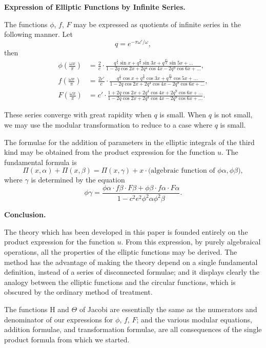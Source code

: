 \documentclass[11pt,a4paper]{book}
\begin{document}
\textbf{Expression of Elliptic Functions by Infinite Series.}

The functions $\phi$, $f$, $F$ may be expressed as quotients of infinite series in the
following manner. Let
\[
q = e^{-\pi \omega'/\omega},
\]
then
\begin{align*}
\phi\left(\frac{\omega x}{\pi}\right) &= \frac{2}{c} \cdot \frac{q^{\frac{1}{4}} \sin x + q^{\frac{9}{4}} \sin 3x + q^{\frac{25}{4}} \sin 5x + \ldots}{1 - 2q \cos 2x + 2q^4 \cos 4x - 2q^9 \cos 6x + \ldots},\\
f\left(\frac{\omega x}{\pi}\right) &= \frac{2c'}{c} \cdot \frac{q^{\frac{1}{4}} \cos x + q^{\frac{9}{4}} \cos 3x + q^{\frac{25}{4}} \cos 5x + \ldots}{1 - 2q \cos 2x + 2q^4 \cos 4x - 2q^9 \cos 6x + \ldots},\\
F\left(\frac{\omega x}{\pi}\right) &= c' \cdot \frac{1 + 2q \cos 2x + 2q^4 \cos 4x + 2q^9 \cos 6x + \ldots}{1 - 2q \cos 2x + 2q^4 \cos 4x - 2q^9 \cos 6x + \ldots}.
\end{align*}

\newpage
\setcounter{page}{153}

These series converge with great rapidity when $q$ is small. When $q$ is not small,
we may use the modular transformation to reduce to a case where $q$ is small.

The formulae for the addition of parameters in the elliptic integrals of the third
kind may be obtained from the product expression for the function $u$. The fundamental
formula is
\[
\Pi(x, \alpha) + \Pi(x, \beta) = \Pi(x, \gamma) + x \cdot \text{(algebraic function of } \phi\alpha, \phi\beta),
\]
where $\gamma$ is determined by the equation
\[
\phi\gamma = \frac{\phi\alpha \cdot f\beta \cdot F\beta + \phi\beta \cdot f\alpha \cdot F\alpha}{1 - c^2 e^2 \phi^2\alpha \phi^2\beta}.
\]

\newpage
\setcounter{page}{154}

\textbf{Conclusion.}

The theory which has been developed in this paper is founded entirely on the
product expression for the function $u$. From this expression, by purely algebraical
operations, all the properties of the elliptic functions may be derived. The method has
the advantage of making the theory depend on a single fundamental definition, instead
of a series of disconnected formulae; and it displays clearly the analogy between the
elliptic functions and the circular functions, which is obscured by the ordinary method
of treatment.

The functions $\mathrm{H}$ and $\Theta$ of Jacobi are essentially the same as the numerators and
denominator of our expressions for $\phi$, $f$, $F$; and the various modular equations,
addition formulae, and transformation formulae, are all consequences of the single
product formula from which we started.
\end{document}
